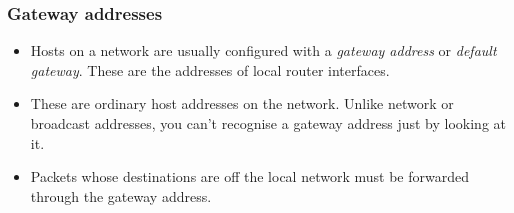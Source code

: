 \documentclass[10pt]{beamer}
\begin{document}
\begin{frame}
  \frametitle{Gateway addresses}

 \begin{itemize}
  \item Hosts on a network are usually configured with a \emph{gateway address} or \emph{default gateway}. These are the addresses of local router interfaces.
  \item These are ordinary host addresses on the network. Unlike network or broadcast addresses, you can't recognise a gateway address just by looking at it.
  \item Packets whose destinations are off the local network must be forwarded through the gateway address.
 \end{itemize}



\end{frame}
\end{document}
